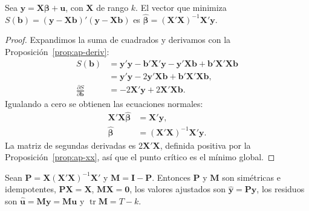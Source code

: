 \begin{proposicion}\label{prop:ap-mco}
Sea $\bm y=\bm X\bm\beta+\bm u$, con $\bm X$ de rango $k$. El vector que minimiza
$S(\bm b)=(\bm y-\bm X\bm b)'(\bm y-\bm X\bm b)$ es $\hat{\bm\beta}=(\bm X'\bm X)^{-1}\bm X'\bm y$.
\end{proposicion}

\begin{proof}
Expandimos la suma de cuadrados y derivamos con la Proposición~\ref{prop:ap-deriv}:
\begin{align*}
  S(\bm b) &= \bm y'\bm y-\bm b'\bm X'\bm y-\bm y'\bm X\bm b+\bm b'\bm X'\bm X\bm b\\
           &= \bm y'\bm y-2\bm y'\bm X\bm b+\bm b'\bm X'\bm X\bm b,\\
  \frac{\partial S}{\partial\bm b} &= -2\bm X'\bm y+2\bm X'\bm X\bm b .
\end{align*}
Igualando a cero se obtienen las ecuaciones normales:
\begin{align*}
  \bm X'\bm X\hat{\bm\beta} &= \bm X'\bm y,\\
  \hat{\bm\beta}            &= (\bm X'\bm X)^{-1}\bm X'\bm y .
\end{align*}
La matriz de segundas derivadas es $2\bm X'\bm X$, definida positiva por la
Proposición~\ref{prop:ap-xx}, así que el punto crítico es el mínimo global.
\end{proof}

\begin{proposicion}\label{prop:ap-proy}
Sean $\bm P=\bm X(\bm X'\bm X)^{-1}\bm X'$ y $\bm M=\bm I-\bm P$. Entonces $\bm P$ y $\bm M$ son
simétricas e idempotentes, $\bm P\bm X=\bm X$, $\bm M\bm X=\bm0$, los valores ajustados son
$\hat{\bm y}=\bm P\bm y$, los residuos son $\hat{\bm u}=\bm M\bm y=\bm M\bm u$ y
$\operatorname{tr}\bm M=T-k$.
\end{proposicion}

